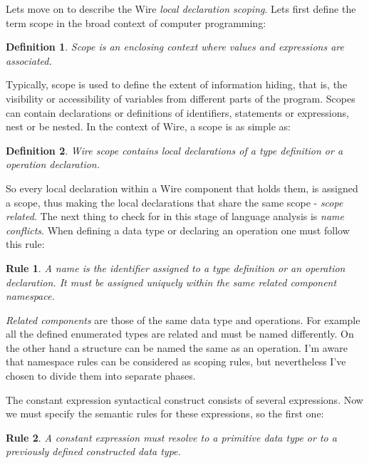 \documentclass[times, utf8, diplomski]{fer}
\newtheorem{wirerule}{Rule}
\newtheorem{wiredef}{Definition}
\begin{document}
Lets move on to describe the Wire \emph{local declaration scoping}. Lets first define 
the term scope in the broad context of computer programming:
\begin{wiredef}
Scope is an enclosing context where values and expressions are associated.
\end{wiredef}

Typically, scope is used to define the extent of information hiding, that is, 
the visibility or accessibility of variables from different parts of the program. 
Scopes can contain declarations or definitions of identifiers, statements or 
expressions, nest or be nested.
In the context of Wire, a scope is as simple as:
\begin{wiredef}
Wire scope contains local declarations of a type definition or a operation declaration.
\end{wiredef}

So every local declaration within a Wire component that holds them, is assigned 
a scope, thus making the local declarations that share the same scope - 
\emph{scope related}.
The next thing to check for in this stage of language analysis is \emph{name conflicts}.
When defining a data type or declaring an operation one must follow this rule:
\begin{wirerule}
A name is the identifier assigned to a type definition or an operation declaration. 
It must be assigned uniquely within the same related component namespace.
\end{wirerule}
\emph{Related components} are those of the same data type and operations. 
For example all the defined enumerated types are related and must be named 
differently. On the other hand a structure can be named the same as an operation.
I'm aware that namespace rules can be considered as scoping rules, 
but nevertheless I've chosen to divide them into separate phases.

The constant expression syntactical construct consists of several expressions. 
Now we must specify the semantic rules for these expressions, so the first one:
\begin{wirerule}
A constant expression must resolve to a primitive data type or to a previously 
defined constructed data type.
\end{wirerule}
\end{document}
